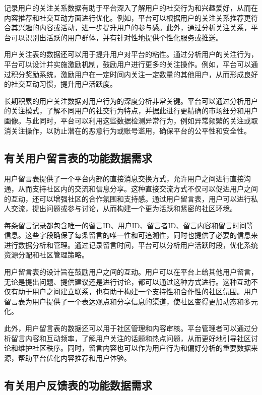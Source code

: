 记录用户的关注关系数据有助于平台深入了解用户的社交行为和兴趣爱好，从而在内容推荐和社交互动方面进行优化。例如，平台可以根据用户的关注关系推荐更符合其兴趣的内容或活动，进一步提升用户的参与感。此外，通过分析关注关系，平台可以识别出活跃的用户群体，并有针对性地提供个性化服务或推送。

用户关注表的数据还可以用于提升用户对平台的粘性。通过分析用户的关注行为，平台可以设计并实施激励机制，鼓励用户进行更多的关注操作。例如，平台可以通过积分奖励系统，激励用户在一定时间内关注一定数量的其他用户，从而形成良好的社交互动习惯，提升用户活跃度。

长期积累的用户关注数据对用户行为的深度分析非常关键。平台可以通过分析用户的关注模式，了解不同用户的社交行为特点，并据此进行更精确的市场细分和用户画像。与此同时，平台可以利用这些数据检测异常行为，例如异常频繁的关注或取消关注操作，以防止潜在的恶意行为或账号滥用，确保平台的公平性和安全性。

\subsection{有关用户留言表的功能数据需求}

用户留言表提供了一个平台内部的直接消息交换方式，允许用户之间进行直接沟通，从而支持社区内的交流和信息分享。这种直接交流方式不仅可以促进用户之间的互动，还可以增强社区的合作氛围和支持感。通过用户留言表，用户可以进行私人交流，提出问题或参与讨论，从而构建一个更为活跃和紧密的社区环境。

每条留言记录都包含唯一的留言ID、用户ID、留言者ID、留言内容和留言时间等信息。这些字段确保了每条留言的唯一性和可追溯性，同时也提供了必要的信息来进行数据分析和管理。通过记录留言时间，平台可以分析用户活跃时段，优化系统资源分配和社区管理策略。

用户留言表的设计旨在鼓励用户之间的互动。用户可以在平台上给其他用户留言，无论是提出问题、提供建议还是进行讨论，都可以通过这种方式进行。这种互动不仅有助于用户之间建立联系，也有助于构建一个支持性和合作性的社区氛围。用户留言表为用户提供了一个表达观点和分享信息的渠道，使社区变得更加动态和多元化。

此外，用户留言表的数据还可以用于社区管理和内容审核。平台管理者可以通过分析留言内容和互动频率，了解用户关注的话题和热点问题，从而更好地引导社区讨论和维护社区秩序。同时，留言内容也可以作为用户行为和偏好分析的重要数据来源，帮助平台优化内容推荐和用户体验。

\subsection{有关用户反馈表的功能数据需求}

